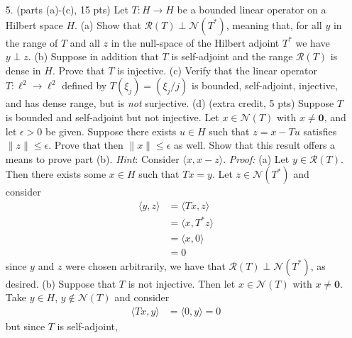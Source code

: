 \documentclass{article}
\begin{document}
\begin{itemize}
    \pagebreak
    \item[5.] (parts (a)-(c), 15 pts) Let $T: H \to H$ be a bounded linear operator on a Hilbert space $H$.
    \newline
    (a) Show that $\mathcal{R}(T) \perp \mathcal{N}(T^*)$, meaning that, for all $y$ in the range of $T$ and all $z$ in the null-space of the Hilbert adjoint $T^*$ we have $y \perp z$. 
    \newline
    (b) Suppose in addition that $T$ is self-adjoint and the range $\mathcal{R}(T)$ is dense in $H$. Prove that $T$ is injective.
    \newline
    (c) Verify that the linear operator $T: \ell^2 \to \ell^2$ defined by $T(\xi_j) = (\xi_j/j)$ is bounded, self-adjoint, injective, and has dense range, but is \textit{not} surjective.
    \newline
    (d) (extra credit, 5 pts) Suppose $T$ is bounded and self-adjoint but not injective. Let $x \in \mathcal{N}(T)$ with $x \neq \mathbf{0}$, and let $\epsilon > 0$ be given. Suppose there exists $u \in H$ such that $z = x - Tu$ satisfies $\|z\| \leq \epsilon$. Prove that then $\|x\| \leq \epsilon$ as well. Show that this result offers a means to prove part (b).
    \newline
    \textit{Hint}: Consider $\langle x, x - z\rangle$.
    \newline\newline
    \textit{Proof:} (a) Let $y \in \mathcal{R}(T)$. Then there exists some $x \in H$ such that $Tx = y$. Let $z \in \mathcal{N}(T^*)$ and consider
    \begin{align*}
        \langle y, z\rangle &= \langle Tx, z\rangle\\
        &= \langle x, T^*z\rangle\\
        &= \langle x, 0\rangle\\
        &= 0
    \end{align*}
    since $y$ and $z$ were chosen arbitrarily, we have that $\mathcal{R}(T) \perp \mathcal{N}(T^*)$, as desired.
    \newline\newline
    (b) Suppose that $T$ is not injective. Then let $x \in \mathcal{N}(T)$ with $x \neq \mathbf{0}$. Take $y \in H$, $y \notin \mathcal{N}(T)$ and consider
    \begin{align*}
        \langle Tx, y\rangle &= \langle 0, y\rangle = 0
    \end{align*}
    but since $T$ is self-adjoint,
    \begin{align*}

\end{align*}
\end{itemize}
\end{document}
